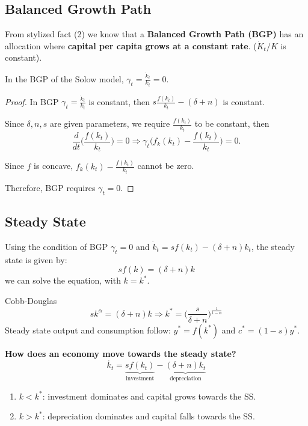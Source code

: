 \subsection{Balanced Growth Path}

From stylized fact (2) we know that a \textbf{Balanced Growth Path (BGP)} has  an allocation where \textbf{capital per capita grows at a constant rate}. ($\dot{K}_t/K$ is constant).

\begin{proposition}
    In the BGP of the Solow model, $\gamma_t = \frac{\dot{k}_t}{k_t} = 0$.
\end{proposition}

\begin{proof}
    In BGP $\gamma_t = \frac{\dot{k}_t}{k_t}$ is constant, then $s \frac{f(k_t)}{k_t} - (\delta + n)$ is constant.

    Since $\delta,n,s$ are given parameters, we require $\frac{f(k_t)}{k_t}$ to be constant, then \[
        \frac{d}{dt}\Big(\frac{f(k_t)}{k_t}\Big) = 0 \Longrightarrow \gamma_t \Big(f_k(k_t) - \frac{f(k_t)}{k_t}\Big) = 0.
    \]

    Since $f$ is concave, $f_k(k_t) - \frac{f(k_t)}{k_t}$ cannot be zero.

    Therefore, BGP requires $\gamma_t = 0$.
\end{proof}

\subsection{Steady State}

Using the condition of BGP $\gamma_t = 0$ and $\dot{k}_t = sf(k_t) - (\delta + n)k_t$, the steady state is given by: \[
    sf(k) = (\delta + n)k
\]
we can solve the equation, with $k = k^*$.

\begin{example}Cobb-Douglas
    \[
        sk^{\alpha} = (\delta + n)k \Longrightarrow k^* = \Big(\frac{s}{\delta + n}\Big)^{\frac{1}{1-\alpha}}
    \]
    Steady state output and consumption follow: $y^* = f(k^*)$ and $c^* = (1-s)y^*$.
\end{example}

\textbf{How does an economy move towards the steady state?} \[
    \dot{k_t} = \underbrace{sf(k_t)}_{\text{investment}} - \underbrace{(\delta + n)k_t}_{\text{depreciation}}
\]
\begin{enumerate}
    \item $k < k^*$: investment dominates and capital grows towards the SS.
    \item $k > k^*$: depreciation dominates and capital falls towards the SS.
\end{enumerate}

